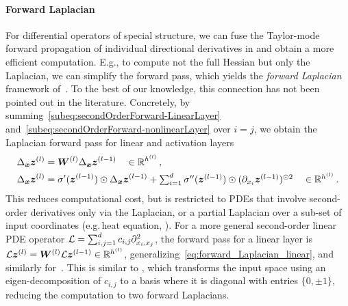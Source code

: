 \paragraph{Forward Laplacian} For differential operators of special structure, we can fuse the Taylor-mode forward propagation of individual directional derivatives in  and obtain a more efficient computation.
E.g., to compute not the full Hessian but only the Laplacian, we can simplify the forward pass, which yields the \emph{forward Laplacian} framework of~\citet{li2023forward}.
To the best of our knowledge, this connection has not been pointed out in the literature.
Concretely, by summing~\eqref{subeq:secondOrderForward-LinearLayer} and~\eqref{subeq:secondOrderForward-nonlinearLayer} over $i=j$, we obtain the Laplacian forward pass for linear and activation layers
\begin{subequations}\label{eq:forward-laplacian-main}
  \begin{align}
    \label{eq:forward_Laplacian_linear}
    \Delta_{\bm{x}}{\bm{z}}^{(l)}
    &=
      {\bm{W}}^{(l)}\Delta_{\bm{x}}{\bm{z}}^{(l-1)}
      \quad \in {\mathbb{R}}^{h^{(l)}}\,,
    \\
    \label{eq:forward_Laplacian_nonlinear}
    \Delta_{\bm{x}}{\bm{z}}^{(l)}
    &=
      \sigma'({\bm{z}}^{(l-1)})\odot\Delta_{\bm{x}}{\bm{z}}^{(l-1)}
      +
      \textstyle
      \sum_{i=1}^d \sigma''({\bm{z}}^{(l-1)})\odot (\partial_{x_i}{{\bm{z}}^{(l-1)}})^{\odot 2}
      \quad \in {\mathbb{R}}^{h^{(l)}}\,.
  \end{align}
\end{subequations}
This reduces computational cost, but is restricted to PDEs that involve second-order derivatives only via the Laplacian, or a partial Laplacian over a sub-set of input coordinates (e.g.\,heat equation, ).
For a more general second-order linear PDE operator ${\mathcal{L}} = \sum_{i,j=1}^d c_{i,j} \partial^2_{{x}_i,{x}_j}$, the forward pass for a linear layer is $\mathcal{L} {\bm{z}}^{(l)} = {\bm{W}}^{(l)}\mathcal{L} {\bm{z}}^{(l-1)} \in {\mathbb{R}}^{h^{(l)}}$, generalizing~\eqref{eq:forward_Laplacian_linear}, and similarly for~.
This is similar to \cite{li2024dof}, which transforms the input space using an eigen-decomposition of $c_{i,j}$ to a basis where it is diagonal with entries $\{0, \pm 1\}$, reducing the computation to two forward Laplacians.


